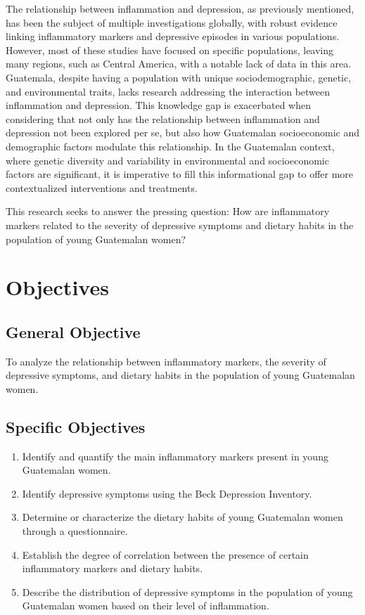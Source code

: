 \documentclass[jou]{apa7}
\begin{document}
The relationship between inflammation and depression, as previously mentioned, has been the subject of multiple investigations globally, with robust evidence linking inflammatory markers and depressive episodes in various populations. However, most of these studies have focused on specific populations, leaving many regions, such as Central America, with a notable lack of data in this area.\\

Guatemala, despite having a population with unique sociodemographic, genetic, and environmental traits, lacks research addressing the interaction between inflammation and depression. This knowledge gap is exacerbated when considering that not only has the relationship between inflammation and depression not been explored per se, but also how Guatemalan socioeconomic and demographic factors modulate this relationship. In the Guatemalan context, where genetic diversity and variability in environmental and socioeconomic factors are significant, it is imperative to fill this informational gap to offer more contextualized interventions and treatments.

This research seeks to answer the pressing question: How are inflammatory markers related to the severity of depressive symptoms and dietary habits in the population of young Guatemalan women?


\section{Objectives}\label{objetivos}

\subsection{General Objective}\label{objetivo-general}

To analyze the relationship between inflammatory markers, the severity of depressive symptoms, and dietary habits in the population of young Guatemalan women.

\subsection{Specific Objectives}\label{objetivos-especuxedficos}

\begin{enumerate}
	\item Identify and quantify the main inflammatory markers present in young Guatemalan women.
	\item Identify depressive symptoms using the Beck Depression Inventory.
	\item Determine or characterize the dietary habits of young Guatemalan women through a questionnaire.
	\item Establish the degree of correlation between the presence of certain inflammatory markers and dietary habits.
	\item Describe the distribution of depressive symptoms in the population of young Guatemalan women based on their level of inflammation.
\end{enumerate}
\end{document}
